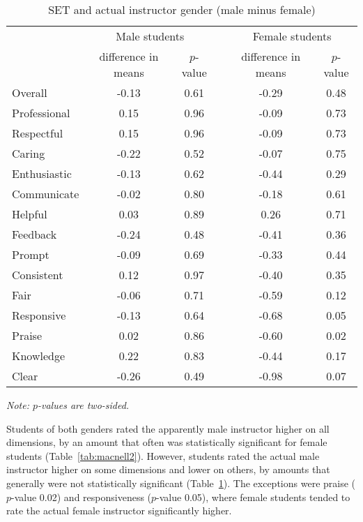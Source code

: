 \documentclass[12pt]{article}
\begin{document}
\begin{table}[htbp]
  \centering
  \footnotesize 
  \caption{SET and actual instructor gender (male minus female)}
    \begin{tabular}{lccccc}
    \toprule 
          & \multicolumn{2}{c}{Male students}  &  & \multicolumn{2}{c}{Female students} \\
                          & difference in means  &  $p$-value &  & difference in means & $p$-value    \\
                          
   \midrule
    Overall &		-0.13	& 0.61 & & -0.29   & 0.48   \\
    Professional &	0.15	& 0.96 & & -0.09   & 0.73   \\
    Respectful  & 	0.15	& 0.96 & & -0.09   & 0.73   \\
    Caring & 		-0.22	& 0.52 & & -0.07   & 0.75  \\
    Enthusiastic &	-0.13	& 0.62 & & -0.44   & 0.29   \\
    Communicate &	-0.02	& 0.80 & & -0.18   & 0.61  \\
    Helpful &		0.03	& 0.89 & &  0.26   & 0.71   \\
    Feedback &		-0.24	& 0.48 & & -0.41   & 0.36   \\
    Prompt &		-0.09	& 0.69 & & -0.33   & 0.44   \\
    Consistent &		0.12	& 0.97 & & -0.40   & 0.35   \\
    Fair &			-0.06	& 0.71 & & -0.59   & 0.12  \\
    Responsive & 	-0.13	& 0.64 & & -0.68   & 0.05  \\
    Praise & 		0.02	& 0.86 & & -0.60   & 0.02  \\
    Knowledge &		0.22	& 0.83 & & -0.44   & 0.17  \\
    Clear &			-0.26	& 0.49 & & -0.98   & 0.07  \\
    \bottomrule
    \end{tabular}%
 \label{tab:macnell3}%

  \textit{Note: $p$-values are two-sided.}  
\end{table}%
\normalsize

Students of both genders rated the apparently male instructor higher on all
dimensions, by an amount that often was statistically significant for female students 
(Table~\ref{tab:macnell2}).
However, students rated the actual male instructor higher on some dimensions
and lower on others, by amounts that generally were not statistically significant
(Table~\ref{tab:macnell3}). 
The exceptions were praise ($p$-value 0.02) and responsiveness ($p$-value 0.05), 
where female students tended to rate the actual female instructor significantly higher.
\end{document}
